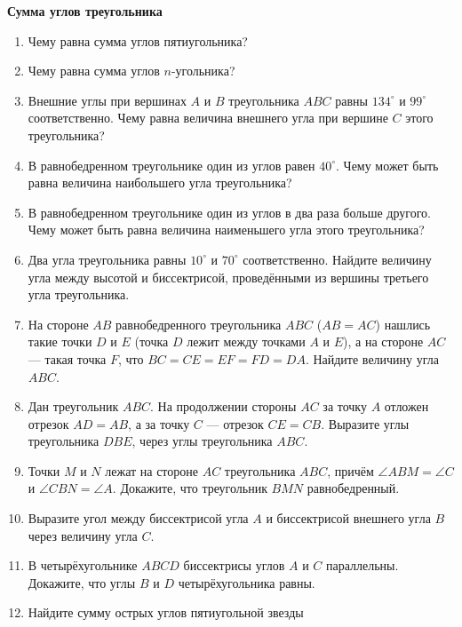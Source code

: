 \documentclass{article}
\begin{document}
\large


\begin{center}
\textbf{Сумма углов треугольника}
\end{center}



\begin{enumerate}[label*=\protect\fbox{\arabic{enumi}}]

\item Чему равна сумма углов пятиугольника?

\item Чему равна сумма углов $n$-угольника?

\item Внешние углы при вершинах $A$ и $B$ треугольника $ABC$ равны $134^\circ$ и $99^\circ$ соответственно. Чему равна величина внешнего угла при вершине $C$ этого треугольника?

\item В равнобедренном треугольнике один из углов равен $40^\circ$. Чему может быть равна величина наибольшего угла треугольника?

\item В равнобедренном треугольнике один из углов в два раза больше другого. Чему может быть равна величина наименьшего угла этого треугольника?

\item Два угла треугольника равны $10^\circ$ и $70^\circ$ соответственно. Найдите величину угла между высотой и биссектрисой, проведёнными из вершины третьего угла треугольника.

\item На стороне $AB$ равнобедренного треугольника $ABC$ ($AB= AC$) нашлись такие точки $D$ и $E$ (точка $D$ лежит между точками $A$ и $E$), а на стороне $AC$ — такая точка $F$, что $BC=CE=EF=FD=DA$. Найдите величину угла $ABC$.

\item Дан треугольник $ABC$. На продолжении стороны $AC$ за точку $A$ отложен отрезок $AD=AB$, а за точку $C$ — отрезок  $CE = CB$. Выразите углы треугольника  $DBE$, через углы треугольника  $ABC$.

\item Точки $M$ и $N$ лежат на стороне $AC$ треугольника $ABC$, причём $\angle ABM = \angle C$ и $\angle CBN=\angle A$. Докажите, что треугольник $BMN$ равнобедренный.

\item Выразите угол между биссектрисой угла $A$ и биссектрисой внешнего угла $B$ через величину угла $C$.

\item В четырёхугольнике $ABCD$ биссектрисы углов $A$ и $C$ параллельны. Докажите, что углы $B$ и $D$ четырёхугольника равны.

\item Найдите сумму острых углов пятиугольной звезды
\end{enumerate}
\end{document}
